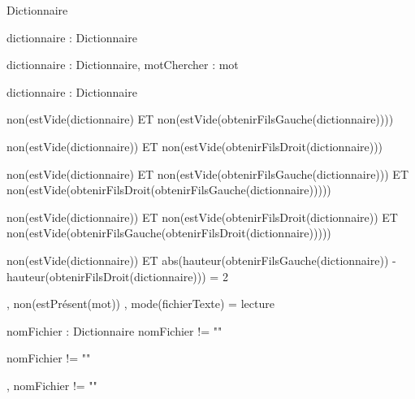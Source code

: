 \begin{algorithme}
		{}%
		{Dictionnaire}
	
		{dictionnaire : Dictionnaire}%
		{\booleen}
	
		{dictionnaire : Dictionnaire, motChercher : mot}%
		{\booleen}

		{dictionnaire : Dictionnaire}%
		{\entier}

		{}%
		{non(estVide(dictionnaire) ET non(estVide(obtenirFilsGauche(dictionnaire))))}

		{}%
		{non(estVide(dictionnaire)) ET non(estVide(obtenirFilsDroit(dictionnaire)))}

		{}
		{non(estVide(dictionnaire) ET non(estVide(obtenirFilsGauche(dictionnaire))) ET non(estVide(obtenirFilsDroit(obtenirFilsGauche(dictionnaire)))))}
	
		{}%
		{non(estVide(dictionnaire)) ET non(estVide(obtenirFilsDroit(dictionnaire)) ET non(estVide(obtenirFilsGauche(obtenirFilsDroit(dictionnaire)))))}

		{}%
		{non(estVide(dictionnaire)) ET abs(hauteur(obtenirFilsGauche(dictionnaire)) - hauteur(obtenirFilsDroit(dictionnaire))) = 2}

		{,}
		{non(estPrésent(mot))}
		{, }%
		{mode(fichierTexte) = lecture}

		{nomFichier : \chaine}
		{Dictionnaire}
		{nomFichier != ""}

		{}%
		{nomFichier != ""}

		{, }%
		{nomFichier != ""}
\end{algorithme}
